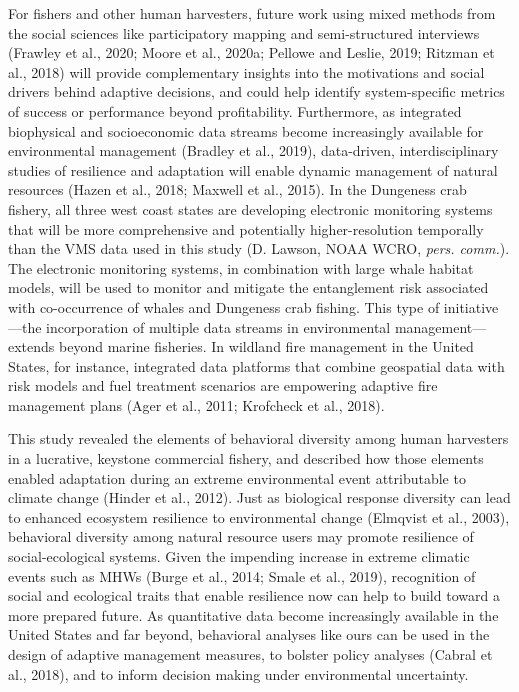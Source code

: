 \documentclass[]{elsarticle} %
\begin{document}
For fishers and other human harvesters, future work using mixed methods
from the social sciences like participatory mapping and semi-structured
interviews (Frawley et al., 2020; Moore et al., 2020a; Pellowe and
Leslie, 2019; Ritzman et al., 2018) will provide complementary insights
into the motivations and social drivers behind adaptive decisions, and
could help identify system-specific metrics of success or performance
beyond profitability. Furthermore, as integrated biophysical and
socioeconomic data streams become increasingly available for
environmental management (Bradley et al., 2019), data-driven,
interdisciplinary studies of resilience and adaptation will enable
dynamic management of natural resources (Hazen et al., 2018; Maxwell et
al., 2015). In the Dungeness crab fishery, all three west coast states
are developing electronic monitoring systems that will be more
comprehensive and potentially higher-resolution temporally than the VMS
data used in this study (D. Lawson, NOAA WCRO, \emph{pers. comm.}). The
electronic monitoring systems, in combination with large whale habitat
models, will be used to monitor and mitigate the entanglement risk
associated with co-occurrence of whales and Dungeness crab fishing. This
type of initiative---the incorporation of multiple data streams in
environmental management---extends beyond marine fisheries. In wildland
fire management in the United States, for instance, integrated data
platforms that combine geospatial data with risk models and fuel
treatment scenarios are empowering adaptive fire management plans (Ager
et al., 2011; Krofcheck et al., 2018).

This study revealed the elements of behavioral diversity among human
harvesters in a lucrative, keystone commercial fishery, and described
how those elements enabled adaptation during an extreme environmental
event attributable to climate change (Hinder et al., 2012). Just as
biological response diversity can lead to enhanced ecosystem resilience
to environmental change (Elmqvist et al., 2003), behavioral diversity
among natural resource users may promote resilience of social-ecological
systems. Given the impending increase in extreme climatic events such as
MHWs (Burge et al., 2014; Smale et al., 2019), recognition of social and
ecological traits that enable resilience now can help to build toward a
more prepared future. As quantitative data become increasingly available
in the United States and far beyond, behavioral analyses like ours can
be used in the design of adaptive management measures, to bolster policy
analyses (Cabral et al., 2018), and to inform decision making under
environmental uncertainty.
\end{document}
